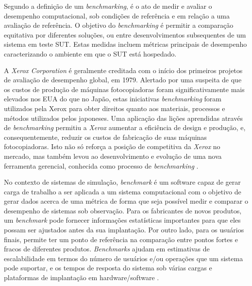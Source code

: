 Segundo  a definição de um \textit{benchmarking}, é o ato de medir e avaliar o desempenho computacional, sob condições de referência e em relação a uma avaliação de referência. O objetivo do \textit{benchmarking} é permitir a comparação equitativa por diferentes soluções, ou entre desenvolvimentos subsequentes de um sistema em teste SUT. Estas medidas incluem métricas principais de desempenho caracterizando o ambiente em que o SUT está hospedado.

A \textit{Xerox Corporation} é geralmente creditada com o início dos primeiros projetos de avaliação de desempenho global, em 1979. Alertado por uma suspeita de que os custos de produção de máquinas fotocopiadoras foram significativamente mais elevados nos EUA do que no Japão, estas iniciativas \textit{benchmarking} foram utilizados pela Xerox para obter direitos quanto aos materiais, processos e métodos utilizados pelos japoneses. Uma aplicação das lições aprendidas através de \textit{benchmarking} permitiu a \textit{Xerox} aumentar a eficiência de design e produção, e, consequentemente, reduzir os custos de fabricação de suas máquinas fotocopiadoras. Isto não só reforça a posição de competitiva da \textit{Xerox} no mercado, mas também levou ao desenvolvimento e evolução de uma nova ferramenta gerencial, conhecida como processo de \textit{benchmarking} \cite{Mahmoud2002}.

No contexto de sistemas de simulação, \textit{benchmark} é um software capaz de gerar carga de trabalho a ser aplicada a um sistema computacional com o objetivo de gerar dados acerca de uma métrica de forma que seja possível medir e comparar o desempenho de sistemas sob observação. Para os fabricantes de novos produtos, um \textit{benchmark} pode fornecer informações estatísticas importantes para que eles possam ser ajustados antes da sua implantação. Por outro lado, para os usuários finais, permite ter um ponto de referência na comparação entre pontos fortes e fracos de diferentes produtos. \textit{Benchmarks} ajudam em estimativas de escalabilidade em termos do número de usuários e/ou operações que um sistema pode suportar, e os tempos de resposta do sistema sob várias cargas e plataformas de implantação em hardware/software \cite{Jutla1999}.

